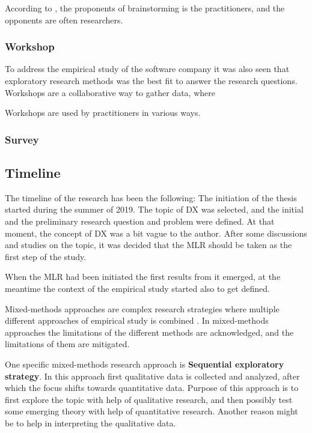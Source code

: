 \documentclass[english, 12pt, a4paper, sci, utf8, a-1b, online]{aaltothesis}
\begin{document}
According to \cite{six-issues-of-brainstorming}, the proponents of brainstorming is the practitioners, and the opponents are often researchers.

\subsubsection{Workshop}

To address the empirical study of the software company it was also seen that exploratory research methods was the best fit to answer the research questions. Workshops are a collaborative way to gather data, where

Workshops are used by practitioners in various ways.

\subsubsection{Survey}

\subsection{Timeline}

The timeline of the research has been the following: The initiation of the thesis started during the summer of 2019. The topic of DX was selected, and the initial and the preliminary research question and problem were defined. At that moment, the concept of DX was a bit vague to the author. After some discussions and studies on the topic, it was decided that the MLR should be taken as the first step of the study.

When the MLR had been initiated the first results from it emerged, at the meantime the context of the empirical study started also to get defined.

Mixed-methods approaches are complex research strategies where multiple different approaches of empirical study is combined \citep{easterbrook2008selecting}. In mixed-methods approaches the limitations of the different methods are acknowledged, and the limitations of them are mitigated.

One specific mixed-methods research approach is \textbf{Sequential exploratory strategy}. In this approach first qualitative data is collected and analyzed, after which the focus shifts towards quantitative data. Purpose of this approach is to first explore the topic with help of qualitative research, and then possibly test some emerging theory with help of quantitative research. Another reason might be to help in interpreting the qualitative data.
\end{document}
